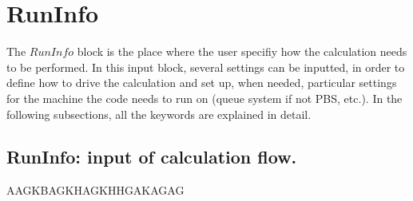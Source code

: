 \section{RunInfo  \\ \vspace{2 mm} {\small }}
The $RunInfo$ block is the place where the user specifiy how the calculation needs to be performed. In this input block, several settings can be inputted, in order to define how to drive the calculation and set up, when needed, particular settings for the machine the code needs to run on (queue system if not PBS, etc.).
In the following subsections, all the keywords are explained in detail.
\subsection{RunInfo: input of calculation flow.}
\label{subsec:runinfoCalcFlow}
AAGKBAGKHAGKHHGAKAGAG

